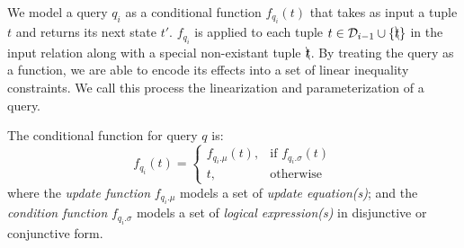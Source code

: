   We model a query $q_i$ as a conditional function $f_{q_i}(t)$ that takes as input a tuple $t$
  and returns its next state $t'$.  $f_{q_i}$ is applied to each 
  tuple $t \in \mathcal{D}_{i-1} \cup \{\bcancel{t}\}$ in the input relation along with a special
  non-existant tuple $\bcancel{t}$. 
  By treating the query as a function, we are able to encode its effects into a set
  of linear inequality constraints.  We call this process the linearization and 
  parameterization of a query.

  \begin{definition} 
  \label{def:cond}
    The conditional function for query $q$ is:
    \[
      f_{q_i}(t)= 
      \begin{cases}
      f_{q_i.\mu} (t) ,& \text{if } f_{q_i.\sigma} (t)\\
      t,              & \text{otherwise}
      \end{cases}
  \]
  where the \textit{update function} $f_{q_i.\mu}$ models a set of \textit{update equation(s)};
  and the \textit{condition function} $f_{q_i.\sigma}$ models a set of \textit{logical expression(s)} in 
  disjunctive or conjunctive form.
  \end{definition} 



